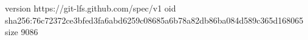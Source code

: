 version https://git-lfs.github.com/spec/v1
oid sha256:76c72372ce3bfed3fa6abd6259c08685a6b78a82db86ba084d589c365d168065
size 9086
